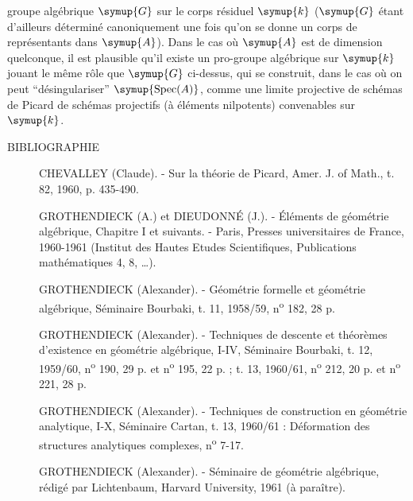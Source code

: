 groupe algébrique $\symup{G}$ sur le corps résiduel $\symup{k}$ ($\symup{G}$ étant d'ailleurs
déterminé canoniquement une fois qu'on se donne un corps de représentants dans
$\symup{A}$). Dans le cas où $\symup{A}$ est de dimension quelconque, il est plausible qu'il
existe un pro-groupe algébrique sur $\symup{k}$ jouant le même rôle que $\symup{G}$ ci-dessus,
qui se construit, dans le cas où on peut ``désingulariser''
$\symup{\operatorname{Spec}(A)}$, comme une limite projective de schémas de Picard de
schémas projectifs (à éléments nilpotents) convenables sur $\symup{k}$.

\begin{center}BIBLIOGRAPHIE\end{center}

\begin{description}
\item[{\normalfont[1]}] CHEVALLEY (Claude). - Sur la théorie de Picard,
Amer. J. of Math., t. 82, 1960, p. 435-490.

\item[{\normalfont[2]}] GROTHENDIECK (A.) et DIEUDONNÉ (J.). - Éléments de géométrie
algébrique, Chapitre I et suivants. - Paris, Presses universitaires de France,
1960-1961 (Institut des Hautes Etudes Scientifiques, Publications
mathématiques 4, 8, \ldots).

\item[{\normalfont[3]}] GROTHENDIECK (Alexander). - Géométrie formelle et géométrie
algébrique, Séminaire Bourbaki, t. 11, 1958/59,
n\textsuperscript{o} 182, 28 p.

\item[{\normalfont[4]}] GROTHENDIECK (Alexander). - Techniques de descente et théorèmes
d'existence en géométrie algébrique, I-IV, Séminaire Bourbaki, t. 12,
1959/60, n\textsuperscript{o} 190, 29 p. et n\textsuperscript{o} 195, 22 p. ;
t. 13, 1960/61, n\textsuperscript{o} 212, 20 p. et
n\textsuperscript{o} 221, 28 p.

\item[{\normalfont[5]}] GROTHENDIECK (Alexander). - Techniques de construction en
géométrie analytique, I-X, Séminaire Cartan, t. 13, 1960/61 :
Déformation des structures analytiques complexes, n\textsuperscript{o} 7-17.

\item[{\normalfont[6]}] GROTHENDIECK (Alexander). - Séminaire de géométrie algébrique,
rédigé par Lichtenbaum, Harvard University, 1961 (à paraître).


\end{description}
